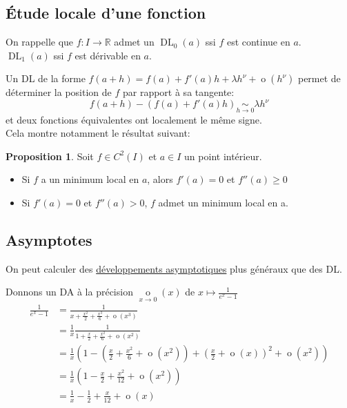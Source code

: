 \documentclass[10pt,a4paper]{article}
\theoremstyle{definition}
\newtheorem{proposition}{Proposition}[section]
\DeclareMathOperator*{\eqv}{\sim}
\DeclareMathOperator*{\negl}{o}
\DeclareMathOperator{\dl}{DL}
\begin{document}
\subsection{Étude locale d'une fonction}
On rappelle que $f: I \to \mathbb{R}$ admet un $\dl_0(a)$ ssi $f$ est continue en $a$. \\
 $\dl_1(a)$ ssi $f$ est dérivable en $a$. \medskip

Un DL de la forme $f(a + h) = f(a) + f'(a) h + \lambda h^\nu + \negl(h^\nu)$ permet de déterminer la position de $f$ par rapport à sa tangente:
\[f(a + h) - (f(a) + f'(a)h) \eqv\limits_{h \to 0} \lambda h^\nu\]
et deux fonctions équivalentes ont localement le même signe. \\
Cela montre notamment le résultat suivant:
\begin{proposition}
Soit $f \in C^2(I)$ et $a \in I$ un point intérieur.
\begin{itemize}
\item Si $f$ a un minimum local en $a$, alors $f'(a) = 0$ et $f''(a) \geq 0$
\item Si $f'(a) = 0$ et $f''(a) > 0$, $f$ admet un minimum local en a.
\end{itemize}
\end{proposition}

\pagebreak

\subsection{Asymptotes}
On peut calculer des \uline{développements asymptotiques} plus généraux que des DL. \medskip

Donnons un DA à la précision $\negl\limits_{x \to 0}(x)$ de $x \mapsto \frac{1}{e^x - 1}$
\begin{align*}
\frac{1}{e^x - 1} &= \frac{1}{x + \frac{x^2}{2} + \frac{x^3}{6} + \negl(x^3)} \\
&= \frac{1}{x} \frac{1}{1 + \frac{x}{2} + \frac{x^2}{6} + \negl(x^2)} \\
&= \frac{1}{x} \left(1 - \left( \frac{x}{2} + \frac{x^2}{6} + \negl(x^2) \right) + \left( \frac{x}{2} + \negl(x) \right)^2 + \negl(x^2) \right) \\
&= \frac{1}{x} \left(1 - \frac{x}{2} + \frac{x^2}{12} + \negl(x^2) \right) \\
&= \frac{1}{x} - \frac{1}{2} + \frac{x}{12} + \negl(x)
\end{align*} \medskip
\end{document}
